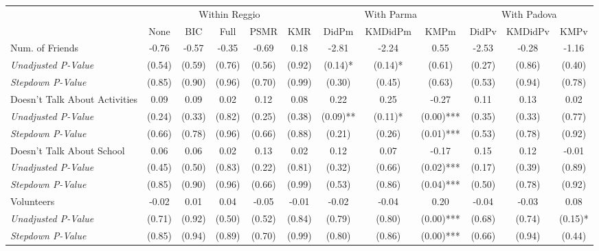 \begin{tabular}{l c c c c c c c c c c c}
\toprule
& \multicolumn{5}{c}{Within Reggio} & \multicolumn{3}{c}{With Parma} & \multicolumn{3}{c}{With Padova} \\\cmidrule(lr){2-6} \cmidrule(lr){7-9} \cmidrule(lr){10-12}
 & None & BIC & Full & PSMR & KMR & DidPm & KMDidPm & KMPm & DidPv & KMDidPv & KMPv \\
\midrule
Num. of Friends & -0.76 & -0.57 & -0.35 & -0.69 & 0.18 & -2.81 & -2.24 & 0.55 & -2.53 & -0.28 & -1.16 \\
\quad \textit{Unadjusted P-Value} & (0.54) & (0.59) & (0.76) & (0.56) & (0.92) & (0.14)* & (0.14)* & (0.61) & (0.27) & (0.86) & (0.40) \\
\quad \textit{Stepdown P-Value} & (0.85) & (0.90) & (0.96) & (0.70) & (0.99) & (0.30) & (0.45) & (0.63) & (0.53) & (0.94) & (0.78) \\
Doesn't Talk About Activities & 0.09 & 0.09 & 0.02 & 0.12 & 0.08 & 0.22 & 0.25 & -0.27 & 0.11 & 0.13 & 0.02 \\
\quad \textit{Unadjusted P-Value} & (0.24) & (0.33) & (0.82) & (0.25) & (0.38) & (0.09)** & (0.11)* & (0.00)*** & (0.35) & (0.33) & (0.77) \\
\quad \textit{Stepdown P-Value} & (0.66) & (0.78) & (0.96) & (0.66) & (0.88) & (0.21) & (0.26) & (0.01)*** & (0.53) & (0.78) & (0.92) \\
Doesn't Talk About School & 0.06 & 0.06 & 0.02 & 0.13 & 0.02 & 0.12 & 0.07 & -0.17 & 0.15 & 0.12 & -0.01 \\
\quad \textit{Unadjusted P-Value} & (0.45) & (0.50) & (0.83) & (0.22) & (0.81) & (0.32) & (0.66) & (0.02)*** & (0.17) & (0.39) & (0.89) \\
\quad \textit{Stepdown P-Value} & (0.85) & (0.90) & (0.96) & (0.66) & (0.99) & (0.53) & (0.86) & (0.04)*** & (0.50) & (0.78) & (0.92) \\
Volunteers & -0.02 & 0.01 & 0.04 & -0.05 & -0.01 & -0.02 & -0.04 & 0.20 & -0.04 & -0.03 & 0.08 \\
\quad \textit{Unadjusted P-Value} & (0.71) & (0.92) & (0.50) & (0.52) & (0.84) & (0.79) & (0.80) & (0.00)*** & (0.68) & (0.74) & (0.15)* \\
\quad \textit{Stepdown P-Value} & (0.85) & (0.94) & (0.89) & (0.70) & (0.99) & (0.80) & (0.86) & (0.00)*** & (0.66) & (0.94) & (0.44) \\
\bottomrule
\end{tabular}
